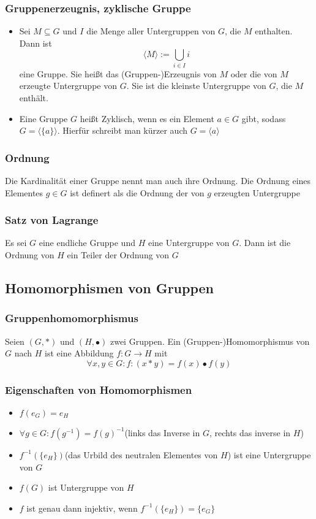\documentclass{kit}
\begin{document}
    \subsubsection{Gruppenerzeugnis, zyklische Gruppe}
      \begin{itemize}
        \item Sei $M\subseteq G$ und $I$ die Menge aller Untergruppen von $G$, die $M$ enthalten. Dann ist
          $$\langle M\rangle:=\bigcup_{i\in I}i$$
          eine Gruppe. Sie heißt das (Gruppen-)Erzeugnis von $M$ oder die von $M$ erzeugte Untergruppe von $G$. Sie ist die kleinste Untergruppe von $G$, die $M$ enthält.
        \item Eine Gruppe $G$ heißt Zyklisch, wenn es ein Element $a\in G$ gibt, sodass $G=\langle\{a\}\rangle$. Hierfür schreibt man kürzer auch $G=\langle a\rangle$
      \end{itemize}
    \subsubsection{Ordnung}
      Die Kardinalität einer Gruppe nennt man auch ihre Ordnung. Die Ordnung eines Elementes $g\in G$ ist definert als die Ordnung der von $g$ erzeugten Untergruppe
    \subsubsection{Satz von Lagrange}
      Es sei $G$ eine endliche Gruppe und $H$ eine Untergruppe von $G$. Dann ist die Ordnung von $H$ ein Teiler der Ordnung von $G$
  \subsection{Homomorphismen von Gruppen}
    \subsubsection{Gruppenhomomorphismus}
      Seien $(G,*)$ und $(H,\bullet)$ zwei Gruppen. Ein (Gruppen-)Homomorphismus von $G$ nach $H$ ist eine Abbildung $f:G\longrightarrow H$ mit
      $$\forall x,y\in G: f:(x*y)=f(x)\bullet f(y)$$
    \subsubsection{Eigenschaften von Homomorphismen}
      \begin{itemize}
        \item $f(e_G)=e_H$
        \item $\forall g\in G:f(g^{-1})=f(g)^{-1}$(links das Inverse in $G$, rechts das inverse in $H$)
        \item $f^{-1}(\{e_H\})$(das Urbild des neutralen Elementes von $H$) ist eine Untergruppe von $G$
        \item $f(G)$ ist Untergruppe von $H$
        \item $f$ ist genau dann injektiv, wenn $f^{-1}(\{e_H\})=\{e_G\}$
      \end{itemize}
\end{document}

